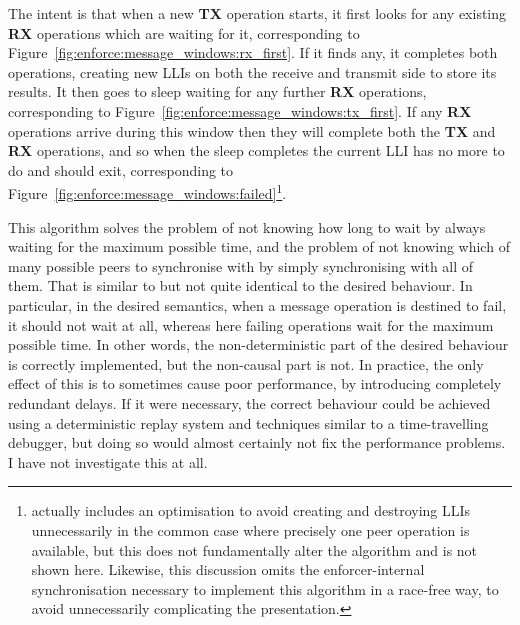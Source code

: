 The intent is that when a new \textbf{TX} operation starts, it first
looks for any existing \textbf{RX} operations which are waiting for
it, corresponding to
Figure~\ref{fig:enforce:message_windows:rx_first}.  If it finds any,
it completes both operations, creating new LLIs on both the receive
and transmit side to store its results.  It then goes to sleep waiting
for any further \textbf{RX} operations, corresponding to
Figure~\ref{fig:enforce:message_windows:tx_first}.  If any \textbf{RX}
operations arrive during this window then they will complete both the
\textbf{TX} and \textbf{RX} operations, and so when the sleep
completes the current LLI has no more to do and should exit,
corresponding to
Figure~\ref{fig:enforce:message_windows:failed}\footnote{{\Implementation}
  actually includes an optimisation to avoid creating and destroying
  LLIs unnecessarily in the common case where precisely one peer
  operation is available, but this does not fundamentally alter the
  algorithm and is not shown here.  Likewise, this discussion omits
  the enforcer-internal synchronisation necessary to implement this
  algorithm in a race-free way, to avoid unnecessarily complicating
  the presentation.}.

This algorithm solves the problem of not knowing how long to wait by
always waiting for the maximum possible time, and the problem of not
knowing which of many possible peers to synchronise with by simply
synchronising with all of them.  That is similar to but not quite
identical to the desired behaviour.  In particular, in the desired
semantics, when a message operation is destined to fail, it should not
wait at all, whereas here failing operations wait for the maximum
possible time.  In other words, the non-deterministic part of the
desired behaviour is correctly implemented, but the non-causal part is
not.  In practice, the only effect of this is to sometimes cause poor
performance, by introducing completely redundant delays.  If it were
necessary, the correct behaviour could be achieved using a
deterministic replay system\needCite{} and techniques similar to a
time-travelling debugger\needCite{}, but doing so would almost
certainly not fix the performance problems.  I have not investigate
this at all.

